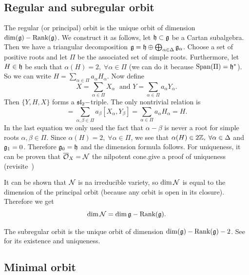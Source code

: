 \subsection{Regular and subregular orbit}
The regular (or principal) orbit is the unique orbit of dimension $\dim(\mathfrak{g})-\text{Rank}(\mathfrak{g})$. 
We construct it as follows, let $\mathfrak{h}\subset \mathfrak{g}$ be a Cartan subalgebra. Then we have a triangular decomposition 
$\mathfrak{g}=\mathfrak{h}\oplus\bigoplus_{\alpha\in\Delta}\mathfrak{g}_\alpha$. Choose a set of positive roots and let $\Pi$ be the 
associated set of simple roots. Furthermore, let $H\in\mathfrak{h}$ be such that $\alpha(H)=2,\;\forall\alpha\in\Pi$ 
(we can do it because $\text{Span}(\Pi)=\mathfrak{h}^*$). So we can write $H=\sum_{\alpha\in\Pi}a_\alpha H_\alpha$. Now define 
\begin{equation}
    X = \sum_{\alpha\in \Pi}X_\alpha\;\text{ and }Y=\sum_{\alpha\in \Pi}a_\alpha Y_\alpha.
\end{equation}
Then $\{Y,H,X\}$ forms a $\mathfrak{sl}_2-$triple. The only nontrivial relation is 
\begin{equation}
    [X,Y]=\sum_{\alpha,\beta\in\Pi}a_\beta[X_\alpha,Y_\beta]=\sum_{\alpha\in\Pi} a_\alpha H_\alpha = H.
\end{equation}
In the last equation we only used the fact that $\alpha -\beta$ is never a root for simple roots $\alpha,\beta\in\Pi$. Since 
$\alpha(H)=2,\;\forall\alpha\in\Pi$, we see that $\alpha(H)\in 2\mathbb{Z},\;\forall\alpha\in\Delta$ and $\mathfrak{g}_1=0$. Therefore 
$\mathfrak{g}_0=\mathfrak{h}$ and the dimension formula follows. For uniqueness, it can be proven that $\overline{\mathcal{O}}_X=\mathcal{N}$ the 
nilpotent cone.\TODO give a proof of uniqueness (revisite~\cite{collingwood2017nilpotent})\par
\begin{remark}
    It can be shown that $\mathcal{N}$ is na irreducible variety, so $\dim \mathcal{N}$ is equal to the dimension of the principal 
    orbit (because any orbit is open in its closure). Therefore we get 
    \begin{equation}
        \dim\mathcal{N} = \dim\mathfrak{g} - \text{Rank}(\mathfrak{g}).
    \end{equation}
\end{remark} 


The subregular orbit is the unique orbit of dimension $\dim(\mathfrak{g})-\text{Rank}(\mathfrak{g})-2$. See~\cite{collingwood2017nilpotent}
for its existence and uniqueness.

\subsection{Minimal orbit}


